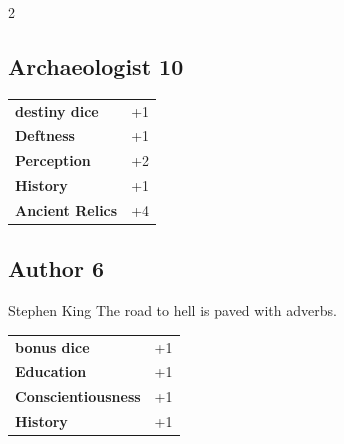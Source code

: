\begin{multicols}{2}
\begin{tcolorbox}

\end{tcolorbox}

\begin{tcolorbox}
    \subsection*{Archaeologist \hfill \small{10 }}
    \tcblower




\begin{tabular}{@{}ll@{}}
    \textbf{destiny dice} & +1\\
    \textbf{Deftness} & +1\\
    \textbf{Perception} & +2\\
    \textbf{History} & +1\\
    \textbf{Ancient Relics} & +4\\
\end{tabular}


\end{tcolorbox}

\begin{tcolorbox}
    \subsection*{Author \hfill \small{6 }}
    \tcblower


\begin{pquote}{Stephen King}
The road to hell is paved with adverbs.
\end{pquote}

\vspace{3mm}

\begin{tabular}{@{}ll@{}}
    \textbf{bonus dice} & +1\\
    \textbf{Education} & +1\\
    \textbf{Conscientiousness} & +1\\
    \textbf{History} & +1\\
\end{tabular}


\end{tcolorbox}
\end{multicols}
